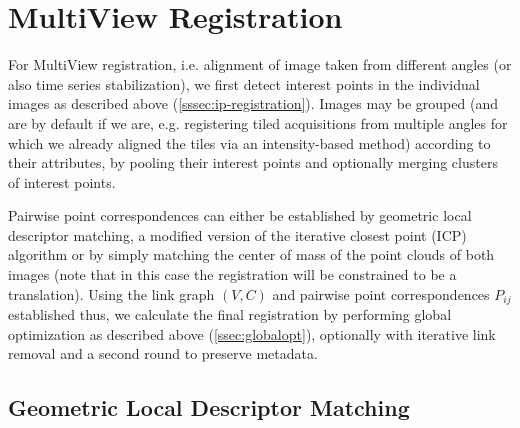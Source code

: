 \section{MultiView Registration}
\label{sec:mvr}

For MultiView registration, i.e. alignment of image taken from different angles (or also time series stabilization), we first detect interest points in the individual images as described above (\ref{sssec:ip-registration}). Images may be grouped (and are by default if we are, e.g. registering tiled acquisitions from multiple angles for which we already aligned the tiles via an intensity-based method) according to their attributes, by pooling their interest points and optionally merging clusters of interest points.

Pairwise point correspondences can either be established by geometric local descriptor matching, a modified version of the iterative closest point (ICP\cite{icp}) algorithm or by simply matching the center of mass of the point clouds of both images (note that in this case the registration will be constrained to be a translation). Using the link graph $(V,C)$ and pairwise point correspondences $P_{ij}$ established thus, we calculate the final registration by performing global optimization as described above (\ref{ssec:globalopt}), optionally with iterative link removal and a second round to preserve metadata.

\subsection*{Geometric Local Descriptor Matching}

